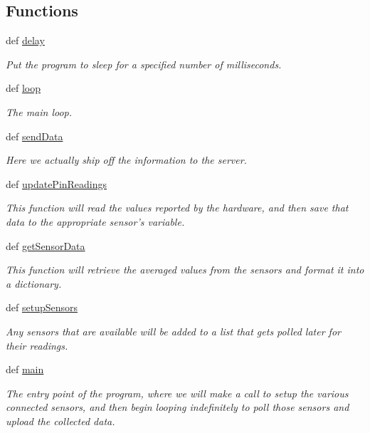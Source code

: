 \subsection*{Functions}
\begin{DoxyCompactItemize}
\item 
def \hyperlink{namespacesensing_a110922c2a80aabf038d162595e137cc4}{delay}
\begin{DoxyCompactList}\small\item\em Put the program to sleep for a specified number of milliseconds. \end{DoxyCompactList}\item 
def \hyperlink{namespacesensing_afc4f85f529614a384ee1d04cd5ff80f3}{loop}
\begin{DoxyCompactList}\small\item\em The main loop. \end{DoxyCompactList}\item 
def \hyperlink{namespacesensing_aeae2450fef0f1a9244c1ddc6d96ef4c2}{send\-Data}
\begin{DoxyCompactList}\small\item\em Here we actually ship off the information to the server. \end{DoxyCompactList}\item 
def \hyperlink{namespacesensing_a75479ff0f15da4027d590f94160bb43f}{update\-Pin\-Readings}
\begin{DoxyCompactList}\small\item\em This function will read the values reported by the hardware, and then save that data to the appropriate sensor's variable. \end{DoxyCompactList}\item 
def \hyperlink{namespacesensing_af9472a5ce179d5f4cbbc2d02a9dbed14}{get\-Sensor\-Data}
\begin{DoxyCompactList}\small\item\em This function will retrieve the averaged values from the sensors and format it into a dictionary. \end{DoxyCompactList}\item 
def \hyperlink{namespacesensing_a3b1d400f9ad84146d60ee62f7e82faa0}{setup\-Sensors}
\begin{DoxyCompactList}\small\item\em Any sensors that are available will be added to a list that gets polled later for their readings. \end{DoxyCompactList}\item 
def \hyperlink{namespacesensing_a38d7f8a9b27bbcf471a89725a5e78493}{main}
\begin{DoxyCompactList}\small\item\em The entry point of the program, where we will make a call to setup the various connected sensors, and then begin looping indefinitely to poll those sensors and upload the collected data. \end{DoxyCompactList}\end{DoxyCompactItemize}
